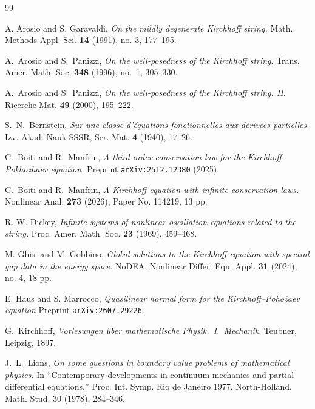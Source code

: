 \documentclass{amsart}
\theoremstyle{definition}
\numberwithin{equation}{section}
\begin{document}
\begin{thebibliography}{99}

A. Arosio and S. Garavaldi,
\emph{On the mildly degenerate Kirchhoff string.}
Math. Methods Appl. Sci. \textbf{14} (1991), no. 3, 177--195.

A.~Arosio and S.~Panizzi,
\emph{On the well-posedness of the {Kirchhoff} string}.
{Trans. Amer. Math. Soc.} \textbf{348} (1996), no.~1, 305--330.

A.~Arosio and S.~Panizzi,
\emph{On the well-posedness of the {Kirchhoff} string. {II}}.
{Ricerche Mat.} \textbf{49} (2000), 195--222.

S.~N.~Bernstein,
\emph{Sur une classe d'{\'e}quations fonctionnelles aux d{\'e}riv{\'e}es partielles.}
{Izv. Akad. Nauk SSSR, Ser. Mat.} \textbf{4} (1940), 17--26.

C.~Boiti and R.~Manfrin,
\emph{A third-order conservation law for the {K}irchhoff-{P}okhozhaev equation.}
Preprint \texttt{arXiv:2512.12380} (2025).

C.~Boiti and R.~Manfrin,
\emph{A {K}irchhoff equation with infinite conservation laws.}
{Nonlinear Anal.} \textbf{273} (2026), Paper No. 114219, 13 pp.

R. W. Dickey,
\emph{Infinite systems of nonlinear oscillation equations related to the string.}
Proc. Amer. Math. Soc. \textbf{23} (1969), 459--468.

M. Ghisi and M. Gobbino,
\emph{Global solutions to the Kirchhoff equation with spectral gap data in the energy space.}
NoDEA, Nonlinear Differ. Equ. Appl. \textbf{31} (2024), no. 4, 18 pp. 

E. Haus and S. Marrocco,
\emph{Quasilinear normal form for the Kirchhoff--Poho{\v z}aev equation}
Preprint \texttt{arXiv:2607.29226}.

G.~Kirchhoff,
\emph{Vorlesungen \"uber mathematische Physik.~I.~Mechanik}.
Teubner, Leipzig, 1897.

J.~L.~Lions, 
\emph{On some questions in boundary value problems of mathematical physics.}
In ``Contemporary developments in continuum mechanics and partial differential equations,'' Proc. Int. Symp. Rio de Janeiro 1977, North-Holland. Math. Stud. 30  (1978), 284--346.


\end{thebibliography}
\end{document}
